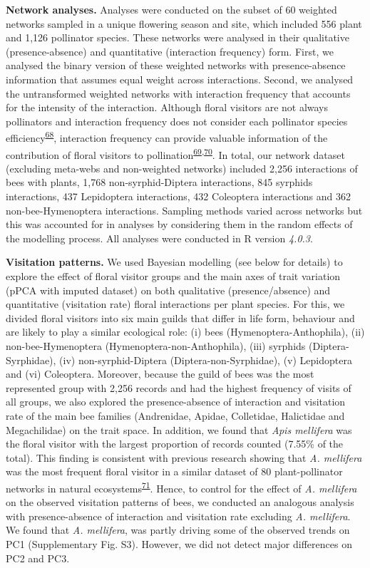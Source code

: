 \documentclass[
  12pt,
  a4paper,
]{article}
\begin{document}
\textbf{Network analyses.} Analyses were conducted on the subset of 60 weighted networks sampled in a unique flowering season and site, which included 556 plant and 1,126 pollinator species. These networks were analysed in their qualitative (presence-absence) and quantitative (interaction frequency) form. First, we analysed the binary version of these weighted networks with presence-absence information that assumes equal weight across interactions. Second, we analysed the untransformed weighted networks with interaction frequency that accounts for the intensity of the interaction. Although floral visitors are not always pollinators and interaction frequency does not consider each pollinator species efficiency\textsuperscript{\protect\hyperlink{ref-ballantyne2015}{68}}, interaction frequency can provide valuable information of the contribution of floral visitors to pollination\textsuperscript{\protect\hyperlink{ref-vazquez2005}{69},\protect\hyperlink{ref-vazquez2012}{70}}. In total, our network dataset (excluding meta-webs and non-weighted networks) included 2,256 interactions of bees with plants, 1,768 non-syrphid-Diptera interactions, 845 syrphids interactions, 437 Lepidoptera interactions, 432 Coleoptera interactions and 362 non-bee-Hymenoptera interactions. Sampling methods varied across networks but this was accounted for in analyses by considering them in the random effects of the modelling process. All analyses were conducted in R version \emph{4.0.3}.

\textbf{Visitation patterns.} We used Bayesian modelling (see below for details) to explore the effect of floral visitor groups and the main axes of trait variation (pPCA with imputed dataset) on both qualitative (presence/absence) and quantitative (visitation rate) floral interactions per plant species. For this, we divided floral visitors into six main guilds that differ in life form, behaviour and are likely to play a similar ecological role: (i) bees (Hymenoptera-Anthophila), (ii) non-bee-Hymenoptera (Hymenoptera-non-Anthophila), (iii) syrphids (Diptera-Syrphidae), (iv) non-syrphid-Diptera (Diptera-non-Syrphidae), (v) Lepidoptera and (vi) Coleoptera. Moreover, because the guild of bees was the most represented group with 2,256 records and had the highest frequency of visits of all groups, we also explored the presence-absence of interaction and visitation rate of the main bee families (Andrenidae, Apidae, Colletidae, Halictidae and Megachilidae) on the trait space. In addition, we found that \emph{Apis mellifera} was the floral visitor with the largest proportion of records counted (7.55\% of the total). This finding is consistent with previous research showing that \emph{A. mellifera} was the most frequent floral visitor in a similar dataset of 80 plant-pollinator networks in natural ecosystems\textsuperscript{\protect\hyperlink{ref-hung2018}{71}}. Hence, to control for the effect of \emph{A. mellifera} on the observed visitation patterns of bees, we conducted an analogous analysis with presence-absence of interaction and visitation rate excluding \emph{A. mellifera}. We found that \emph{A. mellifera}, was partly driving some of the observed trends on PC1 (Supplementary Fig. S3). However, we did not detect major differences on PC2 and PC3.
\end{document}
